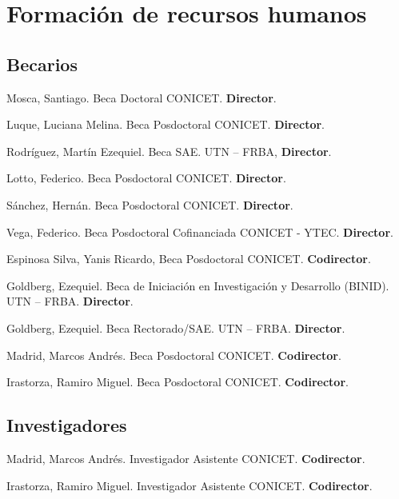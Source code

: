 \section{Formación de recursos humanos}

\subsection{Becarios}
     Mosca, Santiago. Beca Doctoral CONICET. \textbf{Director}.

     Luque, Luciana Melina. Beca Posdoctoral CONICET. \textbf{Director}.

     Rodríguez, Martín Ezequiel. Beca SAE. UTN -- FRBA, \textbf{Director}.

     Lotto, Federico. Beca Posdoctoral CONICET. \textbf{Director}.

     Sánchez, Hernán. Beca Posdoctoral CONICET. \textbf{Director}.

     Vega, Federico. Beca Posdoctoral Cofinanciada CONICET - YTEC. \textbf{Director}.

     Espinosa Silva, Yanis Ricardo, Beca Posdoctoral CONICET. \textbf{Codirector}.

     Goldberg, Ezequiel. Beca de Iniciación en Investigación y Desarrollo (BINID). UTN -- FRBA. \textbf{Director}.

     Goldberg, Ezequiel. Beca Rectorado/SAE. UTN -- FRBA. \textbf{Director}.

     Madrid, Marcos Andrés. Beca Posdoctoral CONICET. \textbf{Codirector}.

     Irastorza, Ramiro Miguel. Beca Posdoctoral CONICET. \textbf{Codirector}.

\subsection{Investigadores}
     Madrid, Marcos Andrés. Investigador Asistente CONICET. \textbf{Codirector}.

     Irastorza, Ramiro Miguel. Investigador Asistente CONICET. \textbf{Codirector}.
  
%   
%   
%   
  

